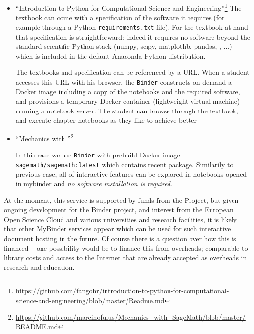 \documentclass{deliverablereport}
\begin{document}
{{{\begin{itemize}
\item ``Introduction to Python for Computational Science and Engineering''\footnote{\scriptsize\url{https://github.com/fangohr/introduction-to-python-for-computational-science-and-engineering/blob/master/Readme.md}}
The textbook can come with a specification of the software it requires
(for example through a Python \texttt{requirements.txt} file). For the
textbook at hand that specification is straightforward: indeed it
requires no software beyond the standard scientific Python stack
(numpy, scipy, matplotlib, pandas, \Jupyter, ...) which is included in
the default Anaconda Python distribution.

The textbooks and specification can be referenced by a URL. When a
student accesses this URL with his browser, the \texttt{Binder}
constructs on demand a Docker image including a copy of the notebooks
and the required software, and provisions a temporary Docker container
(lightweight virtual machine) running a \Jupyter notebook server. The
student can browse through the textbook, and execute chapter notebooks
as they like to achieve better


\item ``Mechanics with \SageMath''\footnote{\scriptsize\url{https://github.com/marcinofulus/Mechanics_with_SageMath/blob/master/README.md}}

In this case we use \texttt{Binder} with prebuild Docker image
\texttt{sagemath/sagemath:latest} which contains recent \SageMath
package. Similarily to previous case, all of interactive features can
be explored in notebooks opened in mybinder and \emph{no software
  installation is required}.


\end{itemize}



At the moment, this service is supported by funds from the \Jupyter
Project, but given ongoing development for the Binder project, and
interest from the European Open Science Cloud and various universities
and research facilities, it is likely that other MyBinder services
appear which can be used for such interactive document hosting in the
future. Of course there is a question over how this is financed -- one
possibility would be to finance this from overheads; comparable to
library costs and access to the Internet that are already accepted as
overheads in research and education.

}}}
\end{document}
